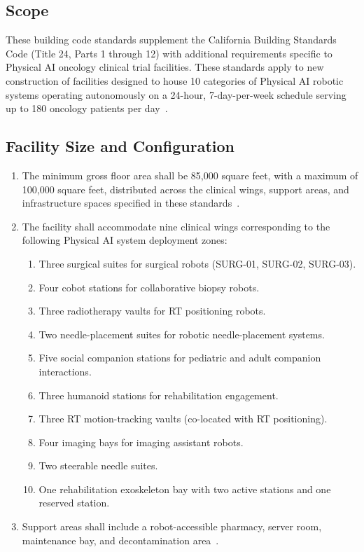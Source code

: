 \documentclass[11pt,letterpaper]{article}
\begin{document}
\subsection{Scope}

These building code standards supplement the California Building Standards Code
(Title 24, Parts 1 through 12) with additional requirements specific to Physical
AI oncology clinical trial facilities. These standards apply to new construction
of facilities designed to house 10 categories of Physical AI robotic systems
operating autonomously on a 24-hour, 7-day-per-week schedule serving up to 180
oncology patients per day~\cite{sitespec2026}.

\subsection{Facility Size and Configuration}

\begin{enumerate}[label=(\alph*)]
\item The minimum gross floor area shall be 85,000 square feet, with a maximum
  of 100,000 square feet, distributed across the clinical wings, support areas,
  and infrastructure spaces specified in these standards~\cite{sitespec2026}.

\item The facility shall accommodate nine clinical wings corresponding to the
  following Physical AI system deployment zones:
  \begin{enumerate}[label=(\arabic*)]
  \item Three surgical suites for surgical robots (SURG-01, SURG-02, SURG-03).
  \item Four cobot stations for collaborative biopsy robots.
  \item Three radiotherapy vaults for RT positioning robots.
  \item Two needle-placement suites for robotic needle-placement systems.
  \item Five social companion stations for pediatric and adult companion
    interactions.
  \item Three humanoid stations for rehabilitation engagement.
  \item Three RT motion-tracking vaults (co-located with RT positioning).
  \item Four imaging bays for imaging assistant robots.
  \item Two steerable needle suites.
  \item One rehabilitation exoskeleton bay with two active stations and one
    reserved station.
  \end{enumerate}

\item Support areas shall include a robot-accessible pharmacy, server room,
  maintenance bay, and decontamination area~\cite{newtrial2026}.
\end{enumerate}
\end{document}
